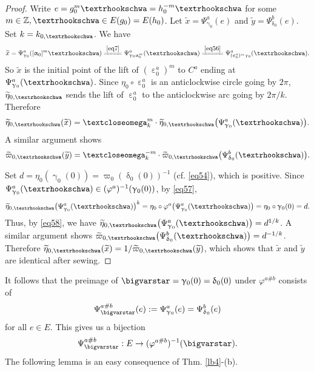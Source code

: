 \documentclass[12pt,a4paper,notitlepage]{article}
\theoremstyle{definition}
\theoremstyle{plain}
\newcommand{\wtd}{\widetilde}
\newcommand{\Zbb}{\mathbb Z}
\newcommand{\tipaomega}{\text{\textcloseomega}}
\newcommand{\tipae}{\text{\textrhookschwa}}
\numberwithin{equation}{subsection}
\begin{document}
\begin{proof}
Write $e=g_0^m\tipae=h_0^{-m}\tipae$ for some $m\in\Zbb,\tipae\in E(g_0)=E(h_0)$. Let $\wtd x=\Psi_{\upgamma_0}^a(e)$ and $\wtd y=\Psi_{\updelta_0}^b(e)$. Set $k=k_{0,\tipae}$. We have
\begin{align*}
\wtd x=\Psi_{\upgamma_0}^a([\upalpha_0]^m\tipae)\xlongequal{\eqref{eq7}}\Psi^a_{\upgamma_0\upalpha_0^m}(\tipae)\xlongequal{\eqref{eq56}}\Psi^a_{(\upepsilon_0^a)^m\upgamma_0}(\tipae).	
\end{align*}
So $\wtd x$ is the initial point of the lift of $(\upepsilon_0^a)^m$ to $C^a$ ending at $\Psi^a_{\upgamma_0}(\tipae)$. Since $\eta_0\circ\upepsilon_0^a$ is  an anticlockwise circle going by $2\pi$, $\wtd\eta_{0,\tipae}$ sends the lift of $\upepsilon_0^a$ to the anticlockwise arc going by $2\pi/k$. Therefore
\begin{align*}
\wtd\eta_{0,\tipae}(\wtd x)=\tipaomega_k^m\cdot\wtd\eta_{0,\tipae}\big(\Psi_{\upgamma_0}^a(\tipae)\big).	
\end{align*}
A similar argument shows
\begin{align*}
\wtd\varpi_{0,\tipae}(\wtd y)=\tipaomega_k^{-m}\cdot\wtd\varpi_{0,\tipae}\big(\Psi_{\updelta_0}^b(\tipae)\big).	
\end{align*}



Set $d=\eta_0(\upgamma_0(0))=\varpi_0(\updelta_0(0))^{-1}$ (cf. \eqref{eq54}), which is positive. Since $\Psi_{\upgamma_0}^a(\tipae)\in(\varphi^a)^{-1}(\upgamma_0(0))$, by \eqref{eq57},
\begin{align*}
\wtd\eta_{0,\tipae}\big(\Psi_{\upgamma_0}^a(\tipae)\big)^k=\eta_0\circ\varphi^a\big(\Psi_{\upgamma_0}^a(\tipae)\big)=\eta_0\circ\upgamma_0(0)=d.
\end{align*}
Thus, by \eqref{eq58}, we have $\wtd\eta_{0,\tipae}\big(\Psi_{\upgamma_0}^a(\tipae)\big)=d^{1/k}$. A similar argument shows $\wtd\varpi_{0,\tipae}\big(\Psi_{\updelta_0}^b(\tipae)\big)=d^{-1/k}$. Therefore $\wtd\eta_{0,\tipae}(\wtd x)=1/\wtd\varpi_{0,\tipae}(\wtd y)$, which shows that $\wtd x$ and $\wtd y$ are identical after sewing.
\end{proof}





It follows that the preimage of $\bigvarstar=\upgamma_0(0)=\updelta_0(0)$ under $\varphi^{a\#b}$ consists of 
\begin{align}
\Psi^{a\#b}_\bigvarstar(e):= \Psi_{\upgamma_0}^a(e)=\Psi_{\updelta_0}^b(e)\label{eq61}	
\end{align}
for all $e\in E$.  This gives us a bijection
\begin{align*}
\Psi_\bigvarstar^{a\#b}:E\rightarrow(\varphi^{a\#b})^{-1}(\bigvarstar).	
\end{align*}
The following lemma is an easy consequence of Thm. \ref{lb4}-(b).
\end{document}
